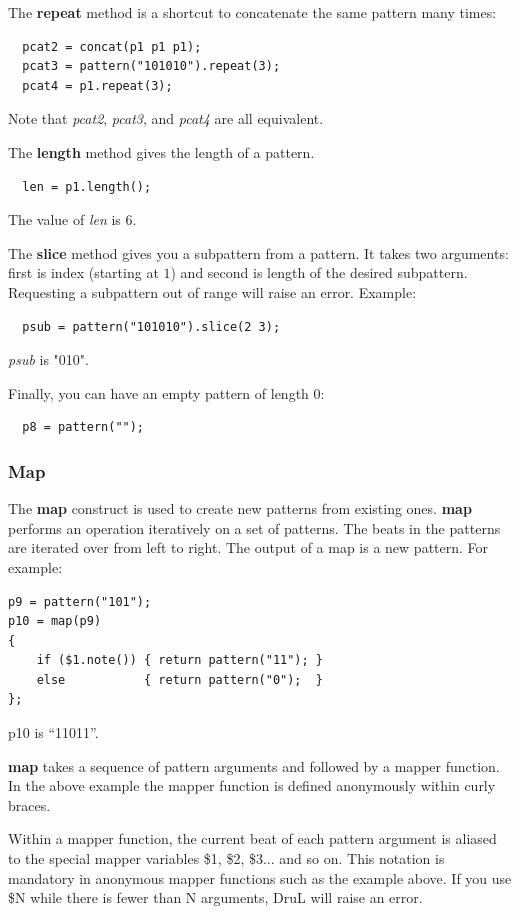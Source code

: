 \documentclass[11pt,twoside]{article}
\begin{document}
The \textbf{repeat} method is a shortcut to concatenate the same pattern many times:
\begin{verbatim}
  pcat2 = concat(p1 p1 p1);
  pcat3 = pattern("101010").repeat(3);
  pcat4 = p1.repeat(3);
\end{verbatim}
Note that \textit{pcat2}, \textit{pcat3}, and \textit{pcat4} are all equivalent.

The \textbf{length} method gives the length of a pattern.
\begin{verbatim}
  len = p1.length();
\end{verbatim}
The value of \textit{len} is $6$.

The \textbf{slice} method gives you a subpattern from a pattern.
It takes two arguments: first is index (starting at $1$) and second is
length of the desired subpattern. Requesting a subpattern out of range will
raise an error. Example:
\begin{verbatim}
  psub = pattern("101010").slice(2 3);
\end{verbatim}
\textit{psub} is "010".


Finally, you can have an empty pattern of length $0$:
\begin{verbatim}
  p8 = pattern("");
\end{verbatim}



\subsubsection{Map}\label{MapSection}

The \textbf{map} construct is used to create new patterns from existing ones.
\textbf{map} performs an operation iteratively on a set of patterns.
The beats in the patterns are iterated over from left to right.
The output of a map is a new pattern.  For example:
\begin{verbatim}
p9 = pattern("101");
p10 = map(p9)
{
    if ($1.note()) { return pattern("11"); }
    else           { return pattern("0");  }
};
\end{verbatim}
p10 is ``11011''.

\textbf{map} takes a sequence of pattern arguments and followed by a mapper function.  In the above example the mapper function is defined anonymously within curly braces.

Within a mapper function, the current beat of each pattern argument is aliased to the special mapper variables \$1, \$2, \$3... and so on.  This notation is mandatory in anonymous mapper functions such as the example above. If you use \$N while there is fewer than N arguments, DruL will raise an error.
\end{document}
